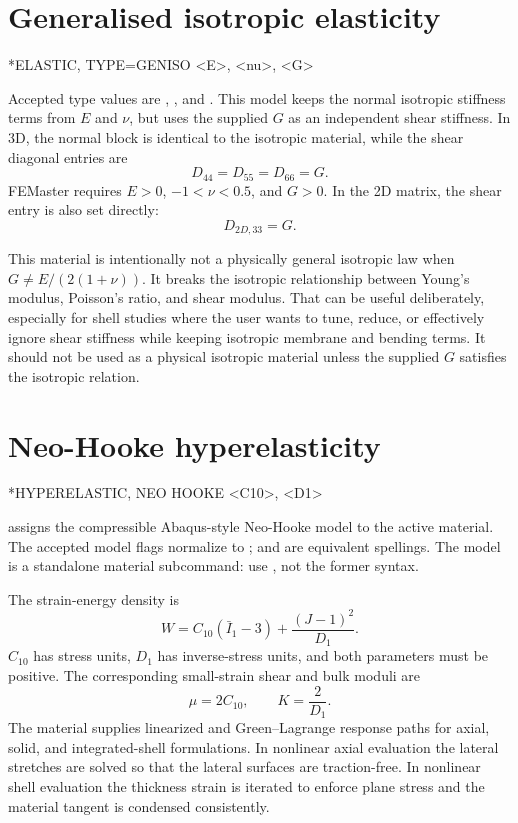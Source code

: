 \section{Generalised isotropic elasticity}

\begin{syntax}
*ELASTIC, TYPE=GENISO
<E>, <nu>, <G>
\end{syntax}

Accepted type values are , , and . This model keeps the normal isotropic stiffness terms from \(E\) and \(\nu\), but uses the supplied \(G\) as an independent shear stiffness. In 3D, the normal block is identical to the isotropic material, while the shear diagonal entries are
\[
D_{44}=D_{55}=D_{66}=G .
\]
FEMaster requires \(E>0\), \(-1<\nu<0.5\), and \(G>0\).
In the 2D matrix, the shear entry is also set directly:
\[
D_{2D,33}=G .
\]

This material is intentionally not a physically general isotropic law when \(G \ne E/(2(1+\nu))\). It breaks the isotropic relationship between Young's modulus, Poisson's ratio, and shear modulus. That can be useful deliberately, especially for shell studies where the user wants to tune, reduce, or effectively ignore shear stiffness while keeping isotropic membrane and bending terms. It should not be used as a physical isotropic material unless the supplied \(G\) satisfies the isotropic relation.

\section{Neo-Hooke hyperelasticity}

\begin{syntax}
*HYPERELASTIC, NEO HOOKE
<C10>, <D1>
\end{syntax}

 assigns the compressible Abaqus-style Neo-Hooke model to the active material. The accepted model flags normalize to ;  and  are equivalent spellings. The model is a standalone material subcommand: use , not the former  syntax.

The strain-energy density is
\[
W=C_{10}(\bar I_1-3)+\frac{(J-1)^2}{D_1}.
\]
\(C_{10}\) has stress units, \(D_1\) has inverse-stress units, and both parameters must be positive. The corresponding small-strain shear and bulk moduli are
\[
\mu=2C_{10},
\qquad
K=\frac{2}{D_1}.
\]
The material supplies linearized and Green--Lagrange response paths for axial, solid, and integrated-shell formulations. In nonlinear axial evaluation the lateral stretches are solved so that the lateral surfaces are traction-free. In nonlinear shell evaluation the thickness strain is iterated to enforce plane stress and the material tangent is condensed consistently.

